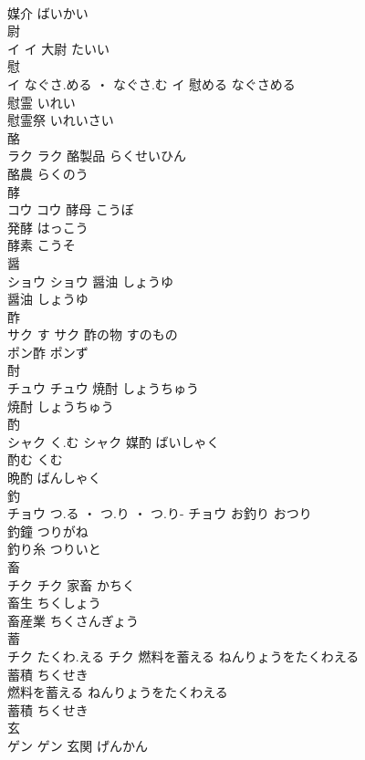 \documentclass[8pt]{extreport}
\begin{document}
\begin{CJK}{UTF8}{min}
\\	媒介	ばいかい	
\\	尉	
\\	イ		イ													大尉	たいい	
\\	慰	
\\	イ	なぐさ.める ・ なぐさ.む	イ	慰める	なぐさめる	
\\	慰霊	いれい	
\\	慰霊祭	いれいさい	
\\	酪	
\\	ラク		ラク	酪製品	らくせいひん	
\\	酪農	らくのう	
\\	酵	
\\	コウ		コウ	酵母	こうぼ	
\\	発酵	はっこう	
\\	酵素	こうそ	
\\	醤	
\\	ショウ		ショウ	醤油	しょうゆ	
\\	醤油	しょうゆ	
\\	酢	
\\	サク	す	サク	酢の物	すのもの	
\\	ポン酢	ポンず	
\\	酎	
\\	チュウ		チュウ	焼酎	しょうちゅう	
\\	焼酎	しょうちゅう	
\\	酌	
\\	シャク	く.む	シャク	媒酌	ばいしゃく	
\\	酌む	くむ	
\\	晩酌	ばんしゃく	
\\	釣	
\\	チョウ	つ.る ・ つ.り ・ つ.り-	チョウ													お釣り	おつり	
\\	釣鐘	つりがね	
\\	釣り糸	つりいと	
\\	畜	
\\	チク		チク	家畜	かちく	
\\	畜生	ちくしょう	
\\	畜産業	ちくさんぎょう	
\\	蓄	
\\	チク	たくわ.える	チク	燃料を蓄える	ねんりょうをたくわえる	
\\	蓄積	ちくせき	
\\	燃料を蓄える	ねんりょうをたくわえる	
\\	蓄積	ちくせき	
\\	玄	
\\	ゲン		ゲン	玄関	げんかん	

\end{CJK}
\end{document}

